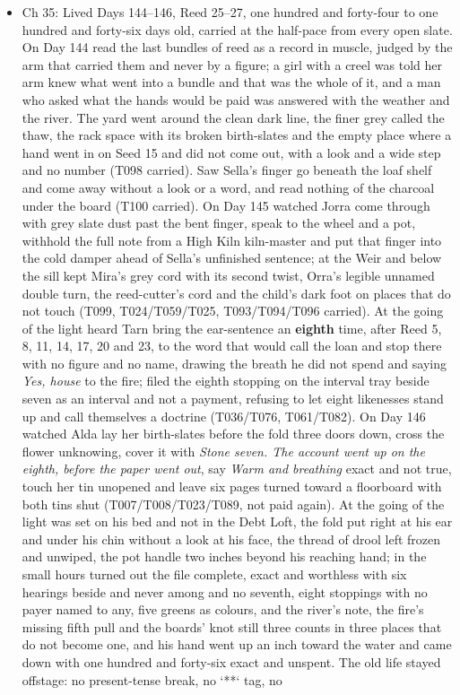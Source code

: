 \documentclass{design/chronicle}
\begin{document}
{\begin{itemize}[leftmargin=1.4em,itemsep=1pt,topsep=3pt,parsep=0pt]
\end{itemize}

\begin{itemize}[leftmargin=1.4em,itemsep=1pt,topsep=3pt,parsep=0pt]

\item Ch 35: Lived Days 144–146, Reed 25–27, one hundred and forty-four to one hundred and forty-six days old, carried at the half-pace from every open slate. On Day 144 read the last bundles of reed as a record in muscle, judged by the arm that carried them and never by a figure; a girl with a creel was told her arm knew what went into a bundle and that was the whole of it, and a man who asked what the hands would be paid was answered with the weather and the river. The yard went around the clean dark line, the finer grey called the thaw, the rack space with its broken birth-slates and the empty place where a hand went in on Seed 15 and did not come out, with a look and a wide step and no number (T098 carried). Saw Sella’s finger go beneath the loaf shelf and come away without a look or a word, and read nothing of the charcoal under the board (T100 carried). On Day 145 watched Jorra come through with grey slate dust past the bent finger, speak to the wheel and a pot, withhold the full note from a High Kiln kiln-master and put that finger into the cold damper ahead of Sella’s unfinished sentence; at the Weir and below the sill kept Mira’s grey cord with its second twist, Orra’s legible unnamed double turn, the reed-cutter’s cord and the child’s dark foot on places that do not touch (T099, T024/T059/T025, T093/T094/T096 carried). At the going of the light heard Tarn bring the ear-sentence an \textbf{eighth} time, after Reed 5, 8, 11, 14, 17, 20 and 23, to the word that would call the loan and stop there with no figure and no name, drawing the breath he did not spend and saying \emph{Yes, house} to the fire; filed the eighth stopping on the interval tray beside seven as an interval and not a payment, refusing to let eight likenesses stand up and call themselves a doctrine (T036/T076, T061/T082). On Day 146 watched Alda lay her birth-slates before the fold three doors down, cross the flower unknowing, cover it with \emph{Stone seven. The account went up on the eighth, before the paper went out}, say \emph{Warm and breathing} exact and not true, touch her tin unopened and leave six pages turned toward a floorboard with both tins shut (T007/T008/T023/T089, not paid again). At the going of the light was set on his bed and not in the Debt Loft, the fold put right at his ear and under his chin without a look at his face, the thread of drool left frozen and unwiped, the pot handle two inches beyond his reaching hand; in the small hours turned out the file complete, exact and worthless with six hearings beside and never among and no seventh, eight stoppings with no payer named to any, five greens as colours, and the river’s note, the fire’s missing fifth pull and the boards’ knot still three counts in three places that do not become one, and his hand went up an inch toward the water and came down with one hundred and forty-six exact and unspent. The old life stayed offstage: no present-tense break, no `**` tag, no 
\end{itemize}}
\end{document}
